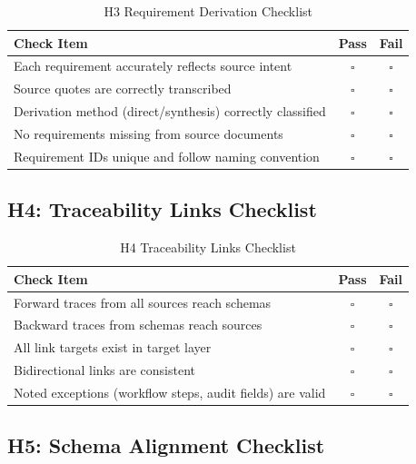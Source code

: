 \documentclass[11pt,a4paper,twoside]{report}
\begin{document}
\begin{table}[h]
\centering
\caption{H3 Requirement Derivation Checklist}
\begin{tabular}{@{}L{10cm}cc@{}}
\toprule
\textbf{Check Item} & \textbf{Pass} & \textbf{Fail} \\
\midrule
Each requirement accurately reflects source intent & $\square$ & $\square$ \\
Source quotes are correctly transcribed & $\square$ & $\square$ \\
Derivation method (direct/synthesis) correctly classified & $\square$ & $\square$ \\
No requirements missing from source documents & $\square$ & $\square$ \\
Requirement IDs unique and follow naming convention & $\square$ & $\square$ \\
\bottomrule
\end{tabular}
\end{table}

\subsection{H4: Traceability Links Checklist}

\begin{table}[h]
\centering
\caption{H4 Traceability Links Checklist}
\begin{tabular}{@{}L{10cm}cc@{}}
\toprule
\textbf{Check Item} & \textbf{Pass} & \textbf{Fail} \\
\midrule
Forward traces from all sources reach schemas & $\square$ & $\square$ \\
Backward traces from schemas reach sources & $\square$ & $\square$ \\
All link targets exist in target layer & $\square$ & $\square$ \\
Bidirectional links are consistent & $\square$ & $\square$ \\
Noted exceptions (workflow steps, audit fields) are valid & $\square$ & $\square$ \\
\bottomrule
\end{tabular}
\end{table}

\subsection{H5: Schema Alignment Checklist}
\end{document}
